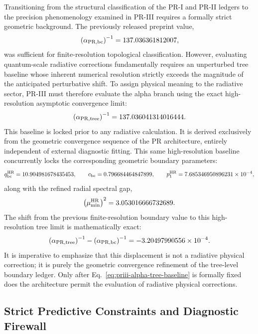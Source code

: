 \documentclass[11pt]{article}
\begin{document}
Transitioning from the structural classification of the PR-I and PR-II ledgers to the precision phenomenology examined in PR-III requires a formally strict geometric background. The previously released preprint value,
\begin{equation}
\left(\alpha_{\rm PR,bc}\right)^{-1}=137.036361812007,
\end{equation}
was sufficient for finite-resolution topological classification. However, evaluating quantum-scale radiative corrections fundamentally requires an unperturbed tree baseline whose inherent numerical resolution strictly exceeds the magnitude of the anticipated perturbative shift.  To assign physical meaning to the radiative sector, PR-III must therefore evaluate the alpha branch using the exact high-resolution asymptotic convergence limit:
\begin{equation}
\left(\alpha_{\rm PR,tree}\right)^{-1}
=
137.036041314016444 .
\label{eq:priii-alpha-tree-baseline}
\end{equation}
This baseline is locked prior to any radiative calculation. It is derived exclusively from the geometric convergence sequence of the PR architecture, entirely independent of external diagnostic fitting. This same high-resolution baseline concurrently locks the corresponding geometric boundary parameters:
\begin{equation}
q_{\rm bc}^{\rm HR}=10.904981678435453,
\qquad
c_{\rm bc}=0.796684464847899,
\qquad
p_1^{\rm HR}=7.685346950896231\times10^{-4},
\end{equation}
along with the refined radial spectral gap,
\begin{equation}
\left(\mu_{\min}^{\rm HR}\right)^2=3.053016666732689 .
\end{equation}
The shift from the previous finite-resolution boundary value to this high-resolution tree limit is mathematically exact:
\begin{equation}
\left(\alpha_{\rm PR,tree}\right)^{-1}
-
\left(\alpha_{\rm PR,bc}\right)^{-1}
=
-3.20497990556\times10^{-4} .
\end{equation}
It is imperative to emphasize that this displacement is not a radiative physical correction; it is purely the geometric convergence refinement of the tree-level boundary ledger. Only after Eq.~\eqref{eq:priii-alpha-tree-baseline} is formally fixed does the architecture permit the evaluation of radiative physical corrections.

\subsection{Strict Predictive Constraints and Diagnostic Firewall}
\label{subsec:priii-no-fit-alpha-policy}
\end{document}

